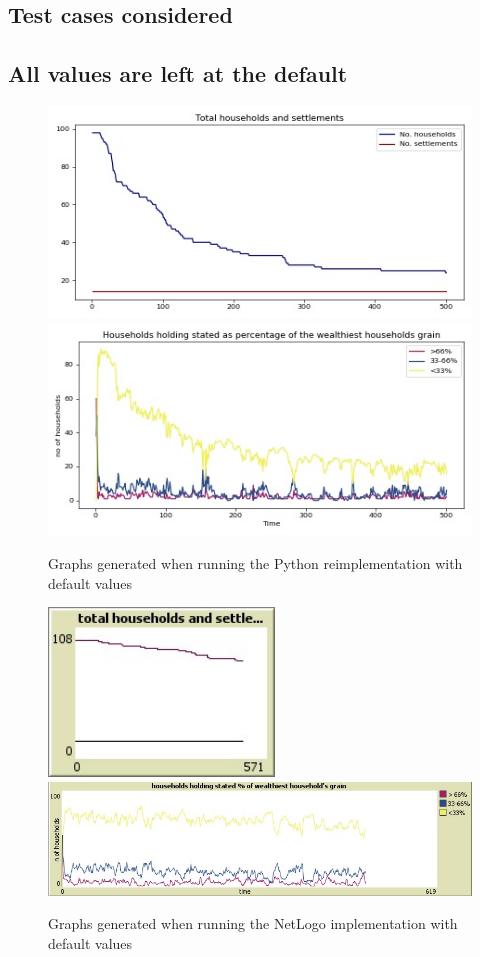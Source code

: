 \documentclass[12pt]{article}
\begin{document}
		\subsection{Test cases considered}
			\subsection{All values are left at the default}
				\begin{figure}[!htb]
					\includegraphics[width=12cm]{Default_values_run1_A}\\
					\includegraphics[width=12cm]{Default_values_run1_B}
					\caption{Graphs generated when running the Python reimplementation with default values}
					\label{fig:Default_values_Ours_1}
				\end{figure}
				
				\begin{figure}[!htb]
					\includegraphics[width=6cm]{Default_values_run1_C}\\
					\includegraphics[width=15cm]{Default_values_run1_D}
					\caption{Graphs generated when running the NetLogo implementation with default values}
					\label{fig:Default_values_Netlogo_1}
				\end{figure}
				
\end{document}
